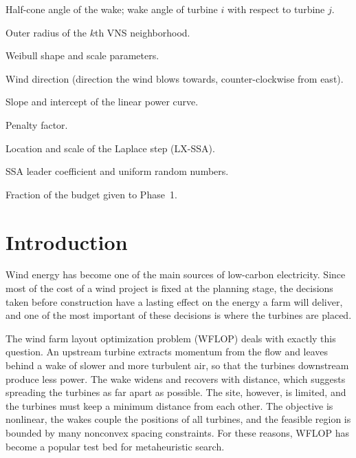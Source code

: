 \documentclass[journal,twoside]{IEEEtran}
\begin{document}
\begin{IEEEdescription}
\item[$\alpha$, $\beta_{ij}$] Half-cone angle of the wake; wake angle of turbine $i$ with respect to turbine $j$.
\item[$\delta_k$] Outer radius of the $k$th VNS neighborhood.
\item[$\zeta$, $\psi$] Weibull shape and scale parameters.
\item[$\theta$] Wind direction (direction the wind blows towards, counter-clockwise from east).
\item[$\lambda_1$, $\lambda_0$] Slope and intercept of the linear power curve.
\item[$\mu$] Penalty factor.
\item[$\phi$, $\chi$] Location and scale of the Laplace step (LX-SSA).
\item[$\xi_1,\xi_2,\xi_3$] SSA leader coefficient and uniform random numbers.
\item[$\omega$] Fraction of the budget given to Phase~1.
\end{IEEEdescription}

\section{Introduction}

Wind energy has become one of the main sources of low-carbon electricity. Since most of the cost of a wind project is fixed at the planning stage, the decisions taken before construction have a lasting effect on the energy a farm will deliver, and one of the most important of these decisions is where the turbines are placed.

The wind farm layout optimization problem (WFLOP) deals with exactly this question. An upstream turbine extracts momentum from the flow and leaves behind a wake of slower and more turbulent air, so that the turbines downstream produce less power. The wake widens and recovers with distance, which suggests spreading the turbines as far apart as possible. The site, however, is limited, and the turbines must keep a minimum distance from each other. The objective is nonlinear, the wakes couple the positions of all turbines, and the feasible region is bounded by many nonconvex spacing constraints. For these reasons, WFLOP has become a popular test bed for metaheuristic search.
\end{document}
